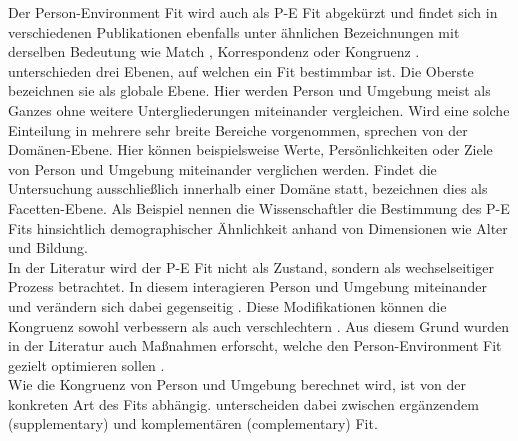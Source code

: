 Der Person-Environment Fit wird auch als P-E Fit abgekürzt \cite[S. 428]{dawis:2002} und findet sich in verschiedenen Publikationen ebenfalls unter ähnlichen Bezeichnungen mit derselben Bedeutung wie Match \cite[S. 2]{player:2017}, Korrespondenz \cite[S. 1]{eggerth:2008} oder Kongruenz \cite[S. 1]{muchinsky:1987}.\\
\textcite[S. 6f.]{edwards:2007} unterschieden drei Ebenen, auf welchen ein Fit bestimmbar ist. Die Oberste bezeichnen sie als globale Ebene. Hier werden Person und Umgebung meist als Ganzes ohne weitere Untergliederungen miteinander vergleichen. Wird eine solche Einteilung in mehrere sehr breite Bereiche vorgenommen, sprechen \textcite[S. 7f.]{edwards:2007} von der Domänen-Ebene. Hier können beispielsweise Werte, Persönlichkeiten oder Ziele von Person und Umgebung miteinander verglichen werden. Findet die Untersuchung ausschließlich innerhalb einer Domäne statt, bezeichnen \textcite[S. 7f.]{edwards:2007} dies als Facetten-Ebene. Als Beispiel nennen die Wissenschaftler die Bestimmung des P-E Fits hinsichtlich demographischer Ähnlichkeit anhand von Dimensionen wie Alter und Bildung.\\
In der Literatur wird der P-E Fit nicht als Zustand, sondern als wechselseitiger Prozess betrachtet. In diesem interagieren Person und Umgebung miteinander und verändern sich dabei gegenseitig \cite[S. 21f.]{roberts:2006}. Diese Modifikationen können die Kongruenz sowohl verbessern als auch verschlechtern \cite[S. 4]{caplan:1987}. Aus diesem Grund wurden in der Literatur auch Maßnahmen erforscht, welche den Person-Environment Fit gezielt optimieren sollen \cite[S. 16]{cable:2001}.\\
Wie die Kongruenz von Person und Umgebung berechnet wird, ist von der konkreten Art des Fits abhängig. \textcite[S. 1]{muchinsky:1987} unterscheiden dabei zwischen ergänzendem (supplementary) und komplementären (complementary) Fit.


